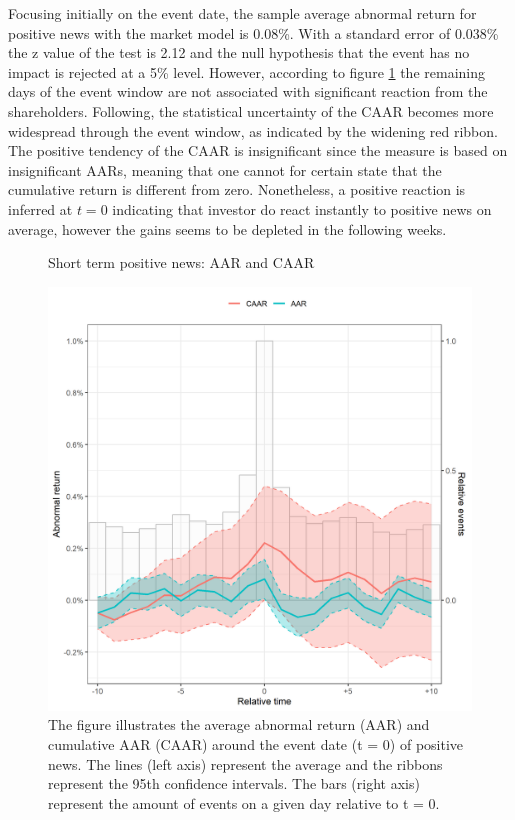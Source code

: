 Focusing initially on the event date, the sample average abnormal return for positive news with the market model is 0.08\%. With a standard error of 0.038\% the z value of the test is 2.12 and the null hypothesis that the event has no impact is rejected at a 5\% level. However, according to figure \ref{fig:ST_pos_news} the remaining days of the event window are not associated with significant reaction  from the shareholders. Following, the statistical uncertainty of the CAAR becomes more widespread through the event window, as indicated by the widening red ribbon. The positive tendency of the CAAR is insignificant since the measure is based on insignificant AARs, meaning that one cannot for certain state that the cumulative return is different from zero. Nonetheless, a positive reaction is inferred at $t=0$ indicating that investor do react instantly to positive news on average, however the gains seems to be depleted in the following weeks.  

\begin{figure} [H] 
    \centering
    \caption{Short term positive news: AAR and CAAR}
    \includegraphics[scale=0.6]{Projekt/1.Figures analysis/ST_positive_all_CI.png}
    \caption*{\footnotesize The figure illustrates the average abnormal return (AAR) and cumulative AAR (CAAR) around the event date (t = 0) of positive news. The lines (left axis) represent the average and the ribbons represent the 95th confidence intervals. The bars (right axis) represent the amount of events on a given day relative to t = 0. }
    \label{fig:ST_pos_news}
\end{figure}

